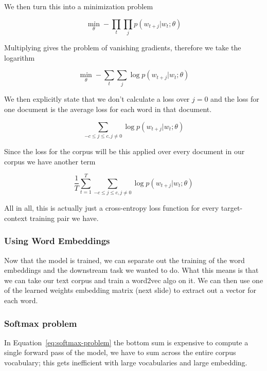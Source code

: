\documentclass[11pt]{article}
\begin{document}
We then turn this into a minimization problem

\begin{equation*}
    \min_\theta - \prod_t \prod_j p(w_{t+j}|w_t;\theta)
\end{equation*}

Multiplying gives the problem of vanishing gradients, therefore we take the logarithm

\begin{equation*}
    \min_\theta - \sum_t \sum_j \log p(w_{t+j}|w_t;\theta)
\end{equation*}

We then explicitly state that we don't calculate a loss over $j=0$ and the loss for one document is the average loss for each word in that document.

\begin{equation*}
    \sum_{-c\leq j \leq c, j \neq 0} \log p(w_{t+j} | w_t ; \theta)
\end{equation*}

Since the loss for the corpus will be this applied over every document in our corpus we have another term

\begin{equation*}
    \frac1 T \sum^T_{t=1} \sum_{-c\leq j \leq c, j \neq 0} \log p(w_{t+j} | w_t ; \theta)
\end{equation*}

All in all, this is actually just a cross-entropy loss function for every target-context training pair we have.

\subsubsection{Using Word Embeddings}

Now that the model is trained, we can separate out the training of the word embeddings and the downstream task we wanted to do. What this means is that we can take our text corpus and train a word2vec algo on it. We can then use one of the learned weights embedding matrix (next slide) to extract out a vector for each word.

\subsubsection{Softmax problem}

In Equation~\ref{eq:softmax-problem} the bottom sum is expensive to compute a single forward pass of the model, we have to sum across the entire corpus vocabulary; this gets inefficient with large vocabularies and large embedding.
\end{document}
